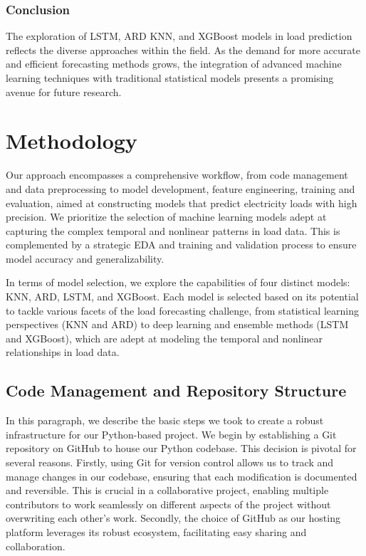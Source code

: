 \documentclass{article} %
\begin{document}
\subsubsection{Conclusion}
The exploration of LSTM, ARD KNN, and XGBoost models in load prediction reflects the diverse approaches within the field. As the demand for more accurate and efficient forecasting methods grows, the integration of advanced machine learning techniques with traditional statistical models presents a promising avenue for future research.



\section{Methodology}
Our approach encompasses a comprehensive workflow, from code management and data preprocessing to model development, feature engineering, training and evaluation, aimed at constructing models that predict electricity loads with high precision. We prioritize the selection of machine learning models adept at capturing the complex temporal and nonlinear patterns in load data. This is complemented by a strategic \gls*{EDA} and training and validation process to ensure model accuracy and generalizability.

In terms of model selection, we explore the capabilities of four distinct models: KNN, ARD, LSTM, and XGBoost. Each model is selected based on its potential to tackle various facets of the load forecasting challenge, from statistical learning perspectives (KNN and ARD) to deep learning and ensemble methods (LSTM and XGBoost), which are adept at modeling the temporal and nonlinear relationships in load data. 

\subsection{Code Management and Repository Structure}
In this paragraph, we describe the basic steps we took to create a robust infrastructure for our Python-based project. We begin by establishing a Git repository on GitHub to house our Python codebase. This decision is pivotal for several reasons. Firstly, using Git for version control allows us to track and manage changes in our codebase, ensuring that each modification is documented and reversible. This is crucial in a collaborative project, enabling multiple contributors to work seamlessly on different aspects of the project without overwriting each other's work. Secondly, the choice of GitHub as our hosting platform leverages its robust ecosystem, facilitating easy sharing and collaboration. 
\end{document}

